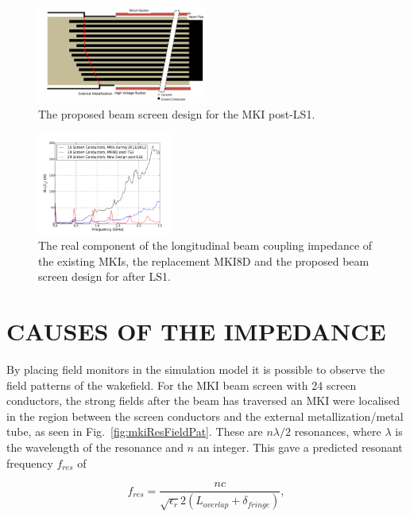 \documentclass{JAC2003}
\begin{document}
\begin{figure}
\includegraphics[width=0.5\textwidth]{mki-final-design.pdf}
\caption{The proposed beam screen design for the MKI post-LS1.}
\label{fig:newScreenDesign}
\end{figure}

\begin{figure}
\begin{center}\includegraphics[width=0.4\textwidth]{realImp.pdf}
\caption{The real component of the longitudinal beam coupling impedance of the existing MKIs, the replacement MKI8D and the proposed beam screen design for after LS1.}
\label{fig:MKIScreenImp}
\end{center}
\end{figure}

\section{CAUSES OF THE IMPEDANCE}

By placing field monitors in the simulation model it is possible to observe the field patterns of the wakefield. For the MKI beam screen with 24 screen conductors, the strong fields after the beam has traversed an MKI were localised in the region between the screen conductors and the external metallization/metal tube, as seen in Fig.~\ref{fig:mkiResFieldPat}. These are $n \lambda /2$ resonances, where $\lambda$ is the wavelength of the resonance and $n$ an integer. This gave a predicted resonant frequency $f_{res}$ of 

\begin{equation}
f_{res} = \frac{nc}{\sqrt{\epsilon_{r}}2 \left( L_{overlap} + \delta_{fringe} \right)},
\label{eqn:imp-overlap-fres}
\end{equation}
\end{document}
